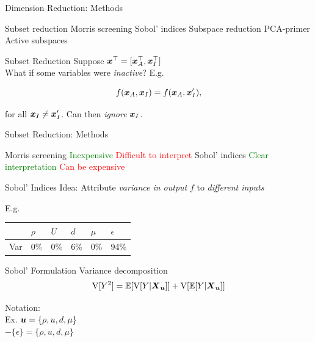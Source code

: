 \documentclass[14pt]{beamer}
\begin{document}
\begin{frame}{Dimension Reduction: Methods}
  \begin{outline}
    \1 Subset reduction
      \2 Morris screening
      \2 Sobol' indices
    \1 Subspace reduction
      \2 PCA-primer
      \2 Active subspaces
  \end{outline}
\end{frame}

\begin{frame}{Subset Reduction}
  Suppose $\boldsymbol{x}^{\top} = [\boldsymbol{x}_A^{\top}, \boldsymbol{x}_I^{\top}]$ \\
  What if some variables were \emph{inactive}? E.g.

  \begin{equation*}
    f(\boldsymbol{x}_A, \boldsymbol{x}_I) = f(\boldsymbol{x}_A, \boldsymbol{x}'_I),
  \end{equation*}

  \noindent for all $\boldsymbol{x}_I \neq \boldsymbol{x}'_I$. Can then \emph{ignore} $\boldsymbol{x}_I$.
\end{frame}

\begin{frame}{Subset Reduction: Methods}
  \begin{outline}
    \1 Morris screening
      \2 \textcolor{green}{Inexpensive}
      \2 \textcolor{red}{Difficult to interpret}
    \1 Sobol' indices
      \2 \textcolor{green}{Clear interpretation}
      \2 \textcolor{red}{Can be expensive}
  \end{outline}
\end{frame}

\begin{frame}{Sobol' Indices}
  Idea: Attribute \emph{variance in output} $f$ to \emph{different inputs}

  \bigskip E.g.
  \begin{table}
    \centering
    \begin{tabular}{@{}llllll@{}}
     & $\rho$ & $U$ & $d$ & $\mu$ & $\epsilon$\\
    \hline
    Var & 0\% & 0\% & 6\% & 0\% & 94\% \\
    \end{tabular}
  \end{table}

\end{frame}

\begin{frame}{Sobol' Formulation}
  Variance decomposition
  \begin{equation*}
    \mathrm{V}[Y^2] = \mathbb{E}[\mathrm{V}[Y|\boldsymbol{X}_{\boldsymbol{u}}]] + \mathrm{V}[\mathbb{E}[Y|\boldsymbol{X}_{\boldsymbol{u}}]]
  \end{equation*}

  Notation: \\
  Ex. $\boldsymbol{u} = \{\rho,u,d,\mu\}$ \\
  $-\{\epsilon\} = \{\rho,u,d,\mu\}$
\end{frame}
\end{document}
